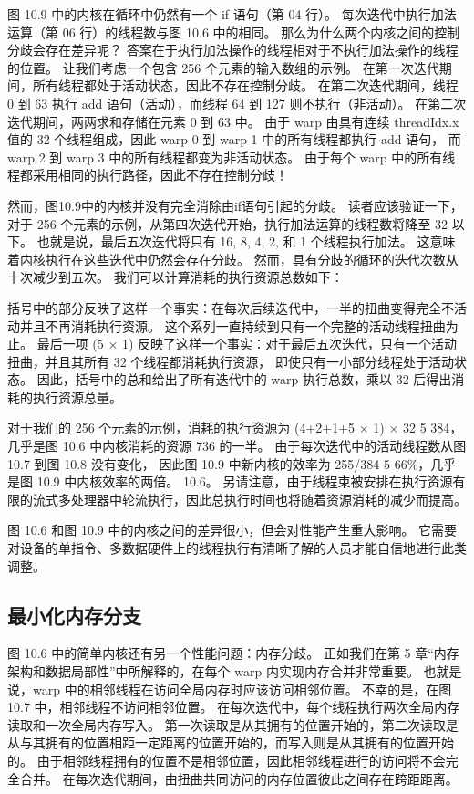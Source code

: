 图 10.9 中的内核在循环中仍然有一个 if 语句（第 04 行）。 
每次迭代中执行加法运算（第 06 行）的线程数与图 10.6 中的相同。 
那么为什么两个内核之间的控制分歧会存在差异呢？ 答案在于执行加法操作的线程相对于不执行加法操作的线程的位置。 
让我们考虑一个包含 256 个元素的输入数组的示例。 在第一次迭代期间，所有线程都处于活动状态，因此不存在控制分歧。 
在第二次迭代期间，线程 0 到 63 执行 add 语句（活动），而线程 64 到 127 则不执行（非活动）。 
在第二次迭代期间，两两求和存储在元素 0 到 63 中。 
由于 warp 由具有连续 threadIdx.x 值的 32 个线程组成，因此 warp 0 到 warp 1 中的所有线程都执行 add 语句，
而 warp 2 到 warp 3 中的所有线程都变为非活动状态。 
由于每个 warp 中的所有线程都采用相同的执行路径，因此不存在控制分歧！

然而，图10.9中的内核并没有完全消除由if语句引起的分歧。 
读者应该验证一下，对于 256 个元素的示例，从第四次迭代开始，执行加法运算的线程数将降至 32 以下。
也就是说，最后五次迭代将只有 16, 8, 4, 2, 和 1 个线程执行加法。 这意味着内核执行在这些迭代中仍然会存在分歧。 
然而，具有分歧的循环的迭代次数从十次减少到五次。 我们可以计算消耗的执行资源总数如下：

括号中的部分反映了这样一个事实：在每次后续迭代中，一半的扭曲变得完全不活动并且不再消耗执行资源。 
这个系列一直持续到只有一个完整的活动线程扭曲为止。 
最后一项 (5 × 1) 反映了这样一个事实：对于最后五次迭代，只有一个活动扭曲，并且其所有 32 个线程都消耗执行资源，
即使只有一小部分线程处于活动状态。 因此，括号中的总和给出了所有迭代中的 warp 执行总数，乘以 32 后得出消耗的执行资源总量。

对于我们的 256 个元素的示例，消耗的执行资源为 (4+2+1+5 × 1) × 32 5 384，几乎是图 10.6 中内核消耗的资源 736 的一半。 
由于每次迭代中的活动线程数从图 10.7 到图 10.8 没有变化，
因此图 10.9 中新内核的效率为 255/384 5 66\%，几乎是图 10.9 中内核效率的两倍。 10.6。 
另请注意，由于线程束被安排在执行资源有限的流式多处理器中轮流执行，因此总执行时间也将随着资源消耗的减少而提高。

图 10.6 和图 10.9 中的内核之间的差异很小，但会对性能产生重大影响。 
它需要对设备的单指令、多数据硬件上的线程执行有清晰了解的人员才能自信地进行此类调整。

\subsection{最小化内存分支}
图 10.6 中的简单内核还有另一个性能问题：内存分歧。 
正如我们在第 5 章“内存架构和数据局部性”中所解释的，在每个 warp 内实现内存合并非常重要。 
也就是说，warp 中的相邻线程在访问全局内存时应该访问相邻位置。 
不幸的是，在图 10.7 中，相邻线程不访问相邻位置。 在每次迭代中，每个线程执行两次全局内存读取和一次全局内存写入。 
第一次读取是从其拥有的位置开始的，第二次读取是从与其拥有的位置相距一定距离的位置开始的，而写入则是从其拥有的位置开始的。 
由于相邻线程拥有的位置不是相邻位置，因此相邻线程进行的访问将不会完全合并。 
在每次迭代期间，由扭曲共同访问的内存位置彼此之间存在跨距距离。

